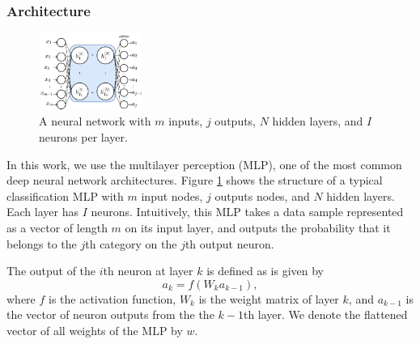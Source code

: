 \documentclass[conference]{IEEEtran}
\begin{document}
\subsubsection{Architecture}\label{sec:MLP}
\begin{figure}[t]
\centering
\includegraphics[width=0.3\textwidth, keepaspectratio]{SimpleNN}
\caption{A neural network with $m$ inputs, $j$ outputs,  $N$  hidden layers, and $I$ neurons per layer.}
\label{fig:SimplNN}
\end{figure}
In this work, we use the multilayer perception (MLP), one of the most common deep neural network architectures. 
Figure \ref{fig:SimplNN} shows the structure of a typical classification MLP with $m$ input nodes, $j$ outputs nodes, and  
$N$ hidden layers. Each layer has $I$ neurons. Intuitively, this MLP takes a data sample represented as a vector of length
$m$ on its input layer, and outputs the probability that it belongs to the $j$th category on the $j$th output neuron.

The output of the $i$th neuron at layer $k$ is defined as is given by 
$$a_k=f(W_k a_{k-1}),$$
where $f$ is the activation function, $W_k$ is the weight matrix of layer $k$,
and $a_{k-1}$ is the vector of neuron outputs from the the $k-1$th layer. 
We denote the flattened vector of all weights of the MLP by $w$. 
\end{document}

